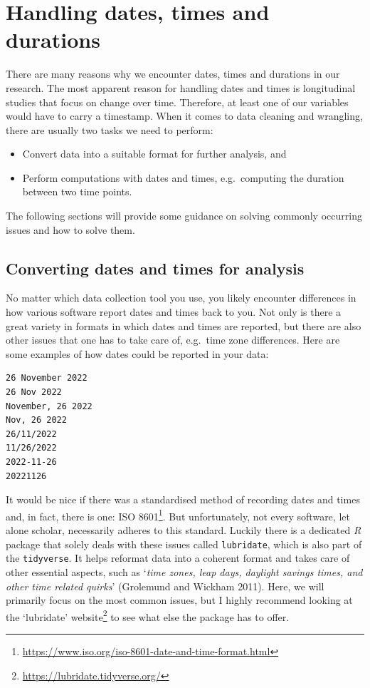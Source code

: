 \documentclass[
  letterpaper,
]{krantz}
\renewcommand{\href}[2]{#2\footnote{\url{#1}}}
\begin{document}
\section{Handling dates, times and
durations}\label{sec-handling-dates-times-and-durations}

There are many reasons why we encounter dates, times and durations in
our research. The most apparent reason for handling dates and times is
longitudinal studies that focus on change over time. Therefore, at least
one of our variables would have to carry a timestamp. When it comes to
data cleaning and wrangling, there are usually two tasks we need to
perform:

\begin{itemize}
\item
  Convert data into a suitable format for further analysis, and
\item
  Perform computations with dates and times, e.g.~computing the duration
  between two time points.
\end{itemize}

The following sections will provide some guidance on solving commonly
occurring issues and how to solve them.

\subsection{Converting dates and times for
analysis}\label{sec-converting-dates-and-times-for-analysis}

No matter which data collection tool you use, you likely encounter
differences in how various software report dates and times back to you.
Not only is there a great variety in formats in which dates and times
are reported, but there are also other issues that one has to take care
of, e.g.~time zone differences. Here are some examples of how dates
could be reported in your data:

\begin{verbatim}
26 November 2022
26 Nov 2022
November, 26 2022
Nov, 26 2022
26/11/2022
11/26/2022
2022-11-26
20221126
\end{verbatim}

It would be nice if there was a standardised method of recording dates
and times and, in fact, there is one:
\href{https://www.iso.org/iso-8601-date-and-time-format.html}{ISO 8601}.
But unfortunately, not every software, let alone scholar, necessarily
adheres to this standard. Luckily there is a dedicated \emph{R} package
that solely deals with these issues called \texttt{lubridate}, which is
also part of the \texttt{tidyverse}. It helps reformat data into a
coherent format and takes care of other essential aspects, such as
`\emph{time zones, leap days, daylight savings times, and other time
related quirks}' (Grolemund and Wickham 2011). Here, we will primarily
focus on the most common issues, but I highly recommend looking at the
\href{https://lubridate.tidyverse.org/}{`lubridate' website} to see what
else the package has to offer.
\end{document}
